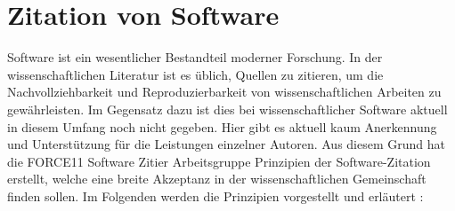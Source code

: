 \section{Zitation von Software}
\label{sec:software-zitation}
Software ist ein wesentlicher Bestandteil moderner Forschung.
In der wissenschaftlichen Literatur ist es üblich, Quellen zu zitieren, um die Nachvollziehbarkeit und Reproduzierbarkeit von wissenschaftlichen Arbeiten zu gewährleisten.
Im Gegensatz dazu ist dies bei wissenschaftlicher Software aktuell in diesem Umfang noch nicht gegeben.
Hier gibt es aktuell kaum Anerkennung und Unterstützung für die Leistungen einzelner Autoren.
Aus diesem Grund hat die \glqq FORCE11 Software Zitier Arbeitsgruppe\grqq{} Prinzipien der Software-Zitation erstellt, welche eine breite Akzeptanz in der wissenschaftlichen Gemeinschaft finden sollen.
Im Folgenden werden die Prinzipien vorgestellt und erläutert \cite{smith_software_2016}:

